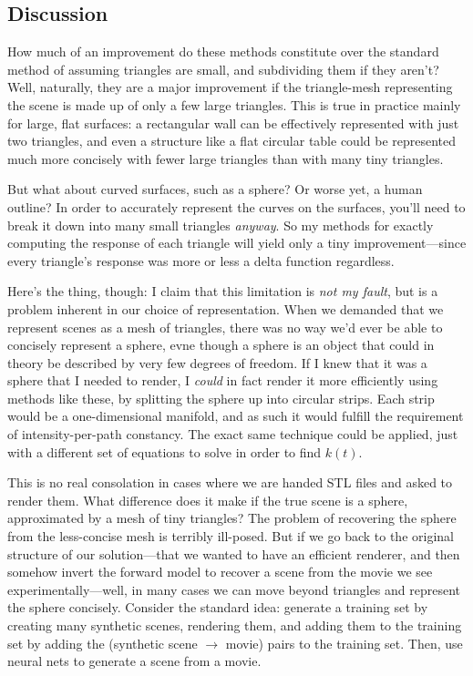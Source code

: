 \documentclass[11pt]{article}
\begin{document}
\subsection{Discussion}

How much of an improvement do these methods constitute over the standard method of assuming triangles are small, and subdividing them if they aren't? Well, naturally, they are a major improvement if the triangle-mesh representing the scene is made up of only a few large triangles. This is true in practice mainly for large, flat surfaces: a rectangular wall can be effectively represented with just two triangles, and even a structure like a flat circular table could be represented much more concisely with fewer large triangles than with many tiny triangles. 

But what about curved surfaces, such as a sphere? Or worse yet, a human outline? In order to accurately represent the curves on the surfaces, you'll need to break it down into many small triangles \emph{anyway}. So my methods for exactly computing the response of each triangle will yield only a tiny improvement---since every triangle's response was more or less a delta function regardless.

Here's the thing, though: I claim that this limitation is \emph{not my fault}, but is a problem inherent in our choice of representation. When we demanded that we represent scenes as a mesh of triangles, there was no way we'd ever be able to concisely represent a sphere, evne though a sphere is an object that could in theory be described by very few degrees of freedom. If I knew that it was a sphere that I needed to render, I \emph{could} in fact render it more efficiently using methods like these, by splitting the sphere up into circular strips. Each strip would be a one-dimensional manifold, and as such it would fulfill the requirement of intensity-per-path constancy. The exact same technique could be applied, just with a different set of equations to solve in order to find $k(t)$.

This is no real consolation in cases where we are handed STL files and asked to render them. What difference does it make if the true scene is a sphere, approximated by a mesh of tiny triangles? The problem of recovering the sphere from the less-concise mesh is terribly ill-posed. But if we go back to the original structure of our solution---that we wanted to have an efficient renderer, and then somehow invert the forward model to recover a scene from the movie we see experimentally---well, in many cases we can move beyond triangles and represent the sphere concisely. Consider the standard idea: generate a training set by creating many synthetic scenes, rendering them, and adding them to the training set by adding the (synthetic scene $\rightarrow$ movie) pairs to the training set. Then, use neural nets to generate a scene from a movie.
\end{document}
